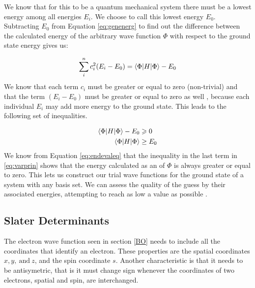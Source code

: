 \documentclass[../master_thesis.tex]{subfiles}
\begin{document}
We know that for this to be a quantum mechanical system there must be a lowest
energy among all energies $E_i$. We choose to call this lowest energy $E_0$.
Subtracting $E_0$ from Equation \ref{eq:genenerg} to find out the difference
between the calculated energy of the arbitrary wave function $\Phi$ with respect
to the ground state energy gives us:

\begin{equation}
   \sum\limits_i^nc_i^2(E_i - E_0) = \braket{\Phi | H | \Phi} - E_0
\end{equation}
We know that each term $c_i$ must be greater or equal to zero (non-trivial) and
that the term $(E_i - E_0)$ must be greater or equal to zero as well
\cite{Cramer:2004}, because each individual $E_i$ may add more energy to the
ground state. This leads to the following set of inequalities.

\begin{equation}
  \begin{split} \label{eq:varprin}
    \braket{\Phi | H | \Phi} - E_0 & \geqslant 0 \\
    \braket{\Phi | H | \Phi} & \geq E_0
  \end{split}
\end{equation}
We know from Equation \ref{eq:endevaleq} that the inequality in the last term in
\ref{eq:varprin} shows that the energy calculated as an \eival of $\Phi$ is
always greater or equal to zero. This lets us construct our trial wave functions
for the ground state of a system with any basis set. We can assess the quality
of the guess by their associated energies, attempting to reach as low a value
as possible \cite{Cramer:2004}.

\subsection{Slater Determinants}
The electron wave function seen in section \ref{BO} needs to include all the
coordinates that identify an electron. These properties are the spatial coordinates
$x, y,\  \text{and}\ z$, and the spin coordinate $s$. Another characteristic is that
it needs to be antisymetric, that is it must change sign whenever the coordinates
of two electrons, spatial and spin, are interchanged\cite{}.
\end{document}
